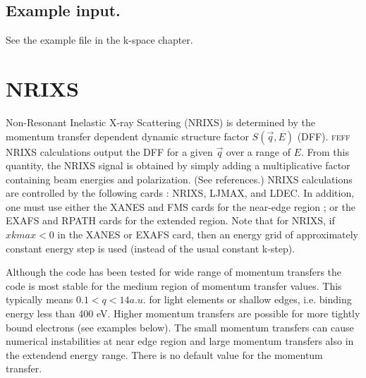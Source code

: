 \documentclass[11pt,oneside]{report} %
\renewcommand{\htmlref}[2]{\hyperlink{#2}{#1}}
\newcommand{\program}[1]{\textsc{#1}}
\newcommand{\feff}{\program{feff}}
\renewcommand{\htmlref}[2]{{#1}} %
\begin{document}
\subsection{Example input.}
See the \htmlref{example file} {sec:k-space} in the k-space chapter.



\section{NRIXS}
\label{sec:nrixs}

Non-Resonant Inelastic X-ray Scattering (NRIXS) is determined by the momentum transfer dependent
dynamic structure factor $S(\vec{q},E)$ (DFF).  {\feff} NRIXS calculations output the DFF for a given $\vec{q}$ over a range of $E$.
From this quantity, the NRIXS signal is obtained by simply adding a multiplicative factor containing beam energies and polarization.  (See references.)
NRIXS calculations are controlled by the following cards :  NRIXS, LJMAX, and LDEC.  In addition, one must use either the XANES 
and FMS cards for the near-edge region ; or the EXAFS and RPATH cards for the extended region.
Note that for NRIXS, if $xkmax < 0$ in the XANES or EXAFS card, then an energy grid of approximately constant energy
step is used (instead of the usual constant k-step).

Although the code has been tested for wide range of momentum transfers the code is most
stable for the medium region of momentum transfer values. This typically means $0.1 < q <
14 a.u.$ for light elements or shallow edges, i.e. binding energy less than 400 eV. Higher
momentum transfers are possible for more tightly bound electrons (see examples below). The
small momentum transfers can cause numerical instabilities at near edge region and large
momentum transfers also in the extendend energy range. There is no default value for the
momentum transfer.
\end{document}
